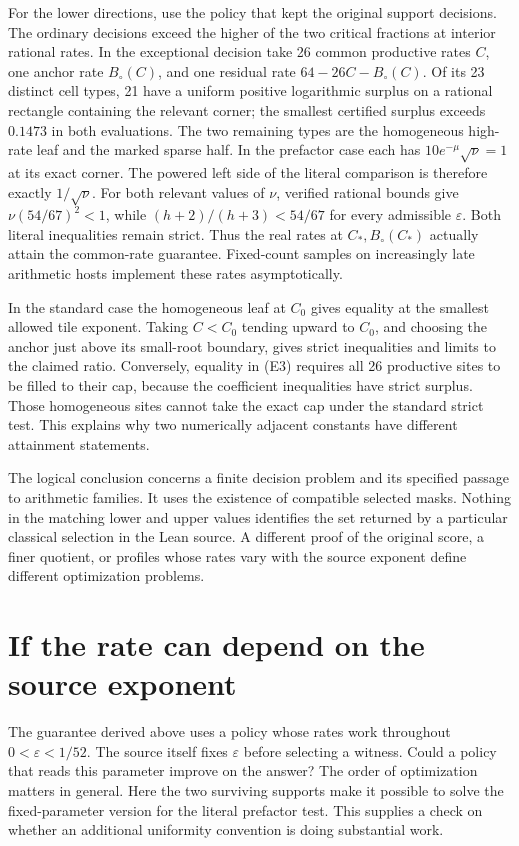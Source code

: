 \documentclass[12pt,letterpaper]{article}
\begin{document}
For the lower directions, use the policy that kept the original support decisions. The ordinary decisions exceed the higher of the two critical fractions at interior rational rates. In the exceptional decision take 26 common productive rates \(C\), one anchor rate \(B_{\circ}(C)\), and one residual rate \(64-26C-B_{\circ}(C)\). Of its 23 distinct cell types, 21 have a uniform positive logarithmic surplus on a rational rectangle containing the relevant corner; the smallest certified surplus exceeds \(0.1473\) in both evaluations. The two remaining types are the homogeneous high-rate leaf and the marked sparse half. In the prefactor case each has \(10e^{-\mu}\sqrt\nu=1\) at its exact corner. The powered left side of the literal comparison is therefore exactly \(1/\sqrt\nu\). For both relevant values of \(\nu\), verified rational bounds give \(\nu(54/67)^2<1\), while \((h+2)/(h+3)<54/67\) for every admissible \(\varepsilon\). Both literal inequalities remain strict. Thus the real rates at \(C_*,B_{\circ}(C_*)\) actually attain the common-rate guarantee. Fixed-count samples on increasingly late arithmetic hosts implement these rates asymptotically.

In the standard case the homogeneous leaf at \(C_0\) gives equality at the smallest allowed tile exponent. Taking \(C<C_0\) tending upward to \(C_0\), and choosing the anchor just above its small-root boundary, gives strict inequalities and limits to the claimed ratio. Conversely, equality in (E3) requires all 26 productive sites to be filled to their cap, because the coefficient inequalities have strict surplus. Those homogeneous sites cannot take the exact cap under the standard strict test. This explains why two numerically adjacent constants have different attainment statements.

The logical conclusion concerns a finite decision problem and its specified passage to arithmetic families. It uses the existence of compatible selected masks. Nothing in the matching lower and upper values identifies the set returned by a particular classical selection in the Lean source. A different proof of the original score, a finer quotient, or profiles whose rates vary with the source exponent define different optimization problems.
\section{If the rate can depend on the source exponent}
The guarantee derived above uses a policy whose rates work throughout \(0<\varepsilon<1/52\). The source itself fixes \(\varepsilon\) before selecting a witness. Could a policy that reads this parameter improve on the answer? The order of optimization matters in general. Here the two surviving supports make it possible to solve the fixed-parameter version for the literal prefactor test. This supplies a check on whether an additional uniformity convention is doing substantial work.
\end{document}
